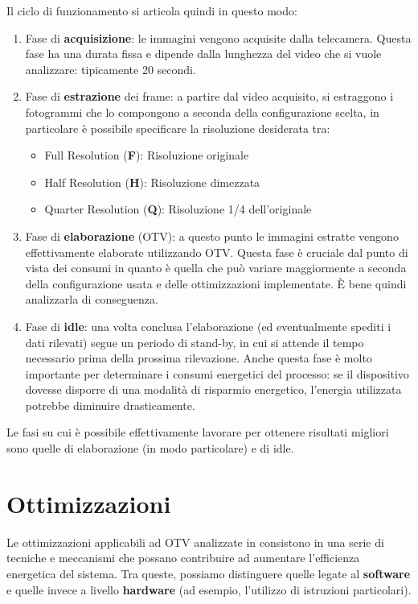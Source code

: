 Il ciclo di funzionamento si articola quindi in questo modo:
\begin{enumerate}
    \item Fase di \textbf{acquisizione}: le immagini vengono acquisite dalla telecamera. Questa fase ha una durata fissa e dipende
    dalla lunghezza del video che si vuole analizzare: tipicamente 20 secondi.
    \item Fase di \textbf{estrazione} dei frame: a partire dal video acquisito, si estraggono i fotogrammi che lo compongono a seconda
    della configurazione scelta, in particolare è possibile specificare la risoluzione desiderata tra:
    \begin{itemize}
        \item Full Resolution (\textbf{F}): Risoluzione originale
        \item Half Resolution (\textbf{H}): Risoluzione dimezzata
        \item Quarter Resolution (\textbf{Q}): Risoluzione 1/4 dell'originale
    \end{itemize}
    \item Fase di \textbf{elaborazione} (OTV): a questo punto le immagini estratte vengono effettivamente elaborate utilizzando
    OTV. Questa fase è cruciale dal punto di vista dei consumi in quanto è quella che può variare maggiormente a seconda della
    configurazione usata e delle ottimizzazioni implementate. È bene quindi analizzarla di conseguenza.
    \item Fase di \textbf{idle}: una volta conclusa l'elaborazione (ed eventualmente spediti i dati rilevati) segue un periodo di stand-by,
    in cui si attende il tempo necessario prima della prossima rilevazione. Anche questa fase è molto importante per determinare
    i consumi energetici del processo: se il dispositivo dovesse disporre di una modalità di risparmio energetico, 
    l'energia utilizzata potrebbe diminuire drasticamente.
\end{enumerate}

Le fasi su cui è possibile effettivamente lavorare per ottenere risultati migliori sono quelle di elaborazione (in modo particolare)
e di idle.

\section{Ottimizzazioni}

Le ottimizzazioni applicabili ad OTV analizzate in \cite{rs12122047} consistono in una serie di tecniche e meccanismi che
possano contribuire ad aumentare l'efficienza energetica del sistema. %
Tra queste, possiamo distinguere quelle legate al \textbf{software} e quelle invece a livello \textbf{hardware} 
(ad esempio, l'utilizzo di istruzioni particolari).

